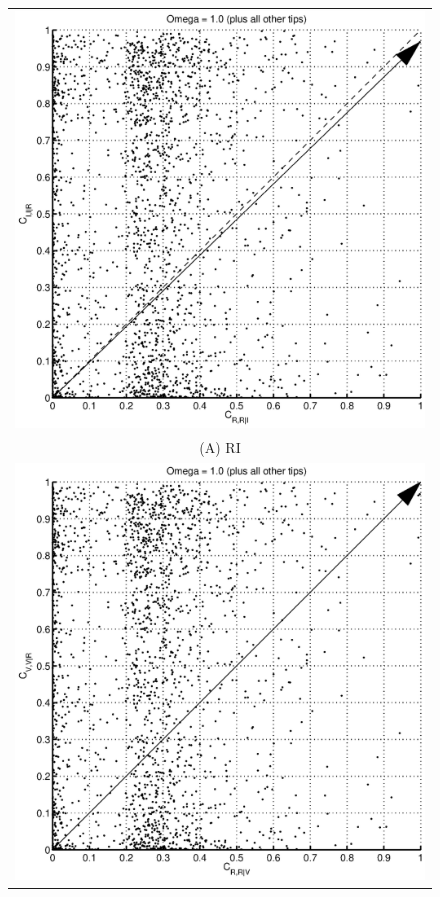 \documentclass[a4paper,11pt]{article}
\begin{document}
\begin{figure}
\begin{tabular}{c}
\includegraphics[scale=0.45]{Figure5A.eps} \\
(A) RI \\[6pt]
\includegraphics[scale=0.45]{Figure5B.eps}\\

\end{tabular}
\end{figure}
\end{document}
